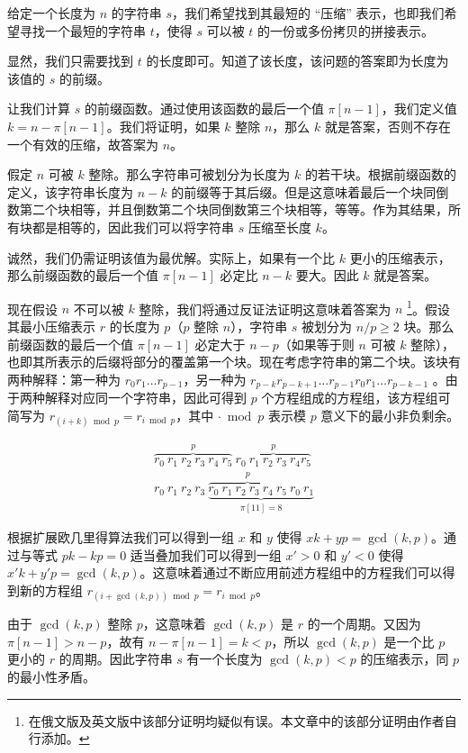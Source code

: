 给定一个长度为 $n$ 的字符串 $s$，我们希望找到其最短的 “压缩” 表示，也即我们希望寻找一个最短的字符串 $t$，使得 $s$ 可以被 $t$ 的一份或多份拷贝的拼接表示。

显然，我们只需要找到 $t$ 的长度即可。知道了该长度，该问题的答案即为长度为该值的 $s$ 的前缀。

让我们计算 $s$ 的前缀函数。通过使用该函数的最后一个值 $\pi[n - 1]$，我们定义值 $k = n - \pi[n - 1]$。我们将证明，如果 $k$ 整除 $n$，那么 $k$ 就是答案，否则不存在一个有效的压缩，故答案为 $n$。

假定 $n$ 可被 $k$ 整除。那么字符串可被划分为长度为 $k$ 的若干块。根据前缀函数的定义，该字符串长度为 $n - k$ 的前缀等于其后缀。但是这意味着最后一个块同倒数第二个块相等，并且倒数第二个块同倒数第三个块相等，等等。作为其结果，所有块都是相等的，因此我们可以将字符串 $s$ 压缩至长度 $k$。

诚然，我们仍需证明该值为最优解。实际上，如果有一个比 $k$ 更小的压缩表示，那么前缀函数的最后一个值 $\pi[n - 1]$ 必定比 $n - k$ 要大。因此 $k$ 就是答案。

现在假设 $n$ 不可以被 $k$ 整除，我们将通过反证法证明这意味着答案为 $n$ \footnote{在俄文版及英文版中该部分证明均疑似有误。本文章中的该部分证明由作者自行添加。}。假设其最小压缩表示 $r$ 的长度为 $p$（$p$ 整除 $n$），字符串 $s$ 被划分为 $n / p \ge 2$ 块。那么前缀函数的最后一个值 $\pi[n - 1]$ 必定大于 $n - p$（如果等于则 $n$ 可被 $k$ 整除），也即其所表示的后缀将部分的覆盖第一个块。现在考虑字符串的第二个块。该块有两种解释：第一种为 $r_0 r_1 \dots r_{p - 1}$，另一种为 $r_{p - k} r_{p - k + 1} \dots r_{p - 1} r_0 r_1 \dots r_{p - k - 1}$ 。由于两种解释对应同一个字符串，因此可得到 $p$ 个方程组成的方程组，该方程组可简写为 $r_{(i + k) \bmod p} = r_{i \bmod p}$，其中 $\cdot \bmod p$ 表示模 $p$ 意义下的最小非负剩余。

$$
\begin{gathered}
\overbrace{r_0 ~ r_1 ~ r_2 ~ r_3 ~ r_4 ~ r_5}^p ~ \overbrace{r_0 ~ r_1 ~ r_2 ~ r_3 ~ r_4 r_5}^p \\
r_0 ~ r_1 ~ r_2 ~ r_3 ~ \underbrace{\overbrace{r_0 ~ r_1 ~ r_2 ~ r_3 ~ r_4 ~ r_5}^p ~ r_0 ~ r_1}_{\pi[11] = 8}
\end{gathered}
$$

根据扩展欧几里得算法我们可以得到一组 $x$ 和 $y$ 使得 $xk + yp = \gcd(k, p)$。通过与等式 $pk - kp = 0$ 适当叠加我们可以得到一组 $x' > 0$ 和 $y' < 0$ 使得 $x'k + y'p = \gcd(k, p)$。这意味着通过不断应用前述方程组中的方程我们可以得到新的方程组 $r_{(i + \gcd(k, p)) \bmod p} = r_{i \bmod p}$。

由于 $\gcd(k, p)$ 整除 $p$，这意味着 $\gcd(k, p)$ 是 $r$ 的一个周期。又因为 $\pi[n - 1] > n - p$，故有 $n - \pi[n - 1] = k < p$，所以 $\gcd(k, p)$ 是一个比 $p$ 更小的 $r$ 的周期。因此字符串 $s$ 有一个长度为 $\gcd(k, p) < p$ 的压缩表示，同 $p$ 的最小性矛盾。

